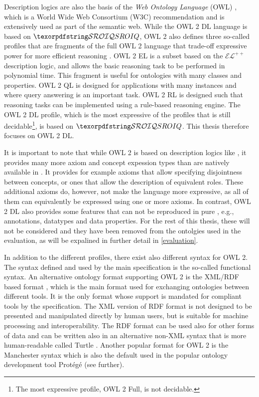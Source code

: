
Description logics are also the basis of the \emph{Web Ontology Language} (OWL) \cite{hitzler2012primer,motik2012ontology}, which is a World Wide Web Consortium (W3C) recommendation and is extensively used as part of the semantic web. While the OWL 2 DL language is based on $\SROIQ$, OWL 2 also defines three so-called profiles that are fragments of the full OWL 2 language that trade-off expressive power for more efficient reasoning \cite{motik2012profiles,motik2012ontology}. OWL 2 EL is a subset based on the $\mathcal{EL}^{++}$ description logic, and allows the basic reasoning task to be performed in polynomial time. This fragment is useful for ontologies with many classes and properties. OWL 2 QL is designed for applications with many instances and where query answering is an important task. OWL 2 RL is designed such that reasoning tasks can be implemented using a rule-based reasoning engine. The OWL 2 DL profile, which is the most expressive of the profiles that is still decidable\footnote{The most expressive profile, OWL 2 Full, is not decidable.}, is based on $\SROIQ$. This thesis therefore focuses on OWL 2 DL.

It is important to note that while OWL 2 is based on description logics like \SROIQ, it provides many more axiom and concept expession types than are natively available in \SROIQ. It provides for example axioms that allow specifying disjointness between concepts, or ones that allow the description of equivalent roles. These additional axioms do, however, not make the language more expressive, as all of them can equivalently be expressed using one or more \SROIQ axioms. In contrast, OWL 2 DL also provides some features that can not be reproduced in pure \SROIQ, e.g., annotations, datatypes and data properties. For the rest of this thesis, these will not be considered and they have been removed from the ontolgies used in the evaluation, as will be expalined in further detail in \cref{evaluation}.

In addition to the different profiles, there exist also different syntax for OWL 2. The syntax defined and used by the main specification \cite{motik2012ontology} is the so-called functional syntax. An alternative ontology format supporting OWL 2 is the XML/RDF based format \cite{beckett2004rdf,motik2009rdf}, which is the main format used for exchanging ontologies between different tools. It is the only format whose support is mandated for compliant tools by the specification. The XML version of RDF format is not designed to be presented and manipulated directly by human users, but is suitable for machine processing and interoperability. The RDF format can be used also for other forms of data and can be written also in an alternative non-XML syntax that is more human-readable called Turtle \cite{beckett2008turtle}. Another popular format for OWL 2 is the Manchester syntax \cite{horridge2009manchester} which is also the default used in the popular ontology development tool Protégé (see further).

